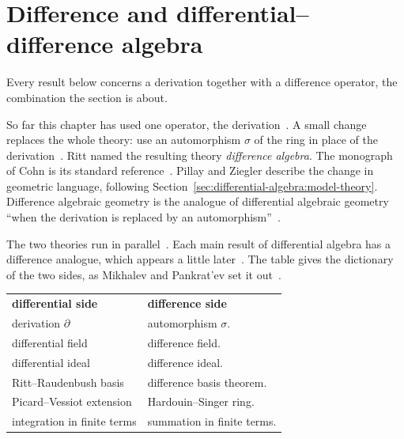 \section{Difference and differential--difference algebra}\label{sec:differential-algebra:difference}

Every result below concerns a derivation together with a difference operator,
the combination the section is about. %

So far this chapter has used one operator, the
derivation~\cite[p.~912]{MikhalevPankratev1989}. A small change replaces the
whole theory: use an automorphism $\sigma$ of the ring in place of the
derivation~\cite[p.~912]{MikhalevPankratev1989}. Ritt named the resulting
theory \emph{difference algebra}. The monograph of Cohn is its standard
reference~\cite[p.~912]{MikhalevPankratev1989}. Pillay and Ziegler describe
the change in geometric language, following
Section~\ref{sec:differential-algebra:model-theory}. Difference algebraic
geometry is the analogue of differential algebraic geometry ``when the
derivation is replaced by an
automorphism''~\cite[p.~579]{PillayZiegler2003}.

The two theories run in parallel~\cite[p.~912]{MikhalevPankratev1989}. Each
main result of differential algebra has a difference analogue, which appears a
little later~\cite[p.~912]{MikhalevPankratev1989}. The table gives the
dictionary of the two sides, as Mikhalev and Pankrat'ev set it
out~\cite[p.~912]{MikhalevPankratev1989}.

\begin{center}
\renewcommand{\arraystretch}{1.2}
\setlength{\tabcolsep}{4pt}
\begin{tabular}{ll}
\textbf{differential side} & \textbf{difference side} \\[2pt]
derivation $\partial$ & automorphism $\sigma$. \\
differential field & difference field. \\
differential ideal & difference ideal. \\
Ritt--Raudenbush basis & difference basis theorem. \\
Picard--Vessiot extension & Hardouin--Singer ring. \\
integration in finite terms & summation in finite terms.
\end{tabular}
\end{center}


